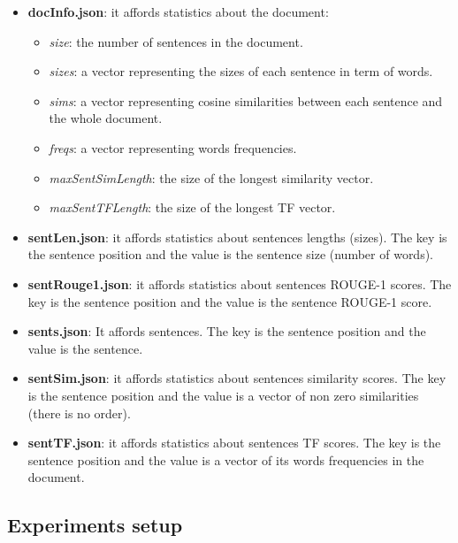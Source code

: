 \begin{itemize}
	\item \textbf{docInfo.json}: it affords statistics about the document:
	\begin{itemize}
		\item \textit{size}: the number of sentences in the document.
		\item \textit{sizes}: a vector representing the sizes of each sentence in term of words.
		\item \textit{sims}: a vector representing cosine similarities between each sentence and the whole document.
		\item \textit{freqs}: a vector representing words frequencies.
		\item \textit{maxSentSimLength}: the size of the longest similarity vector.
		\item \textit{maxSentTFLength}: the size of the longest TF vector.
	\end{itemize}

    \item \textbf{sentLen.json}: it affords statistics about sentences lengths (sizes). The key is the sentence position and the value is the sentence size (number of words).
    
    \item \textbf{sentRouge1.json}: it affords statistics about sentences ROUGE-1 scores. The key is the sentence position and the value is the sentence ROUGE-1 score.
    
    \item \textbf{sents.json}: It affords sentences. The key is the sentence position and the value is the sentence.
    
    \item \textbf{sentSim.json}: it affords statistics about sentences similarity scores. The key is the sentence position and the value is a vector of non zero similarities (there is no order).
    
    \item \textbf{sentTF.json}: it affords statistics about sentences TF scores. The key is the sentence position and the value is a vector of its words frequencies in the document.
    
\end{itemize}

\subsection{Experiments setup}

